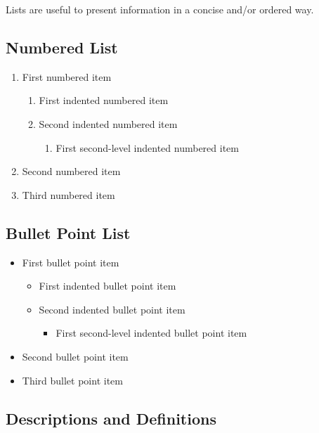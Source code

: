 \documentclass[
	11pt, %
	fleqn, %
	a4paper, %
]{LegrandOrangeBook}
\begin{document}
Lists are useful to present information in a concise and/or ordered way.

\subsection{Numbered List}

\begin{enumerate}
	\item First numbered item
	      \begin{enumerate}
		      \item First indented numbered item
		      \item Second indented numbered item
		            \begin{enumerate}
			            \item First second-level indented numbered item
		            \end{enumerate}
	      \end{enumerate}
	\item Second numbered item
	\item Third numbered item
\end{enumerate}

\subsection{Bullet Point List}

\begin{itemize}
	\item First bullet point item
	      \begin{itemize}
		      \item First indented bullet point item
		      \item Second indented bullet point item
		            \begin{itemize}
			            \item First second-level indented bullet point item
		            \end{itemize}
	      \end{itemize}
	\item Second bullet point item
	\item Third bullet point item
\end{itemize}

\subsection{Descriptions and Definitions}
\end{document}
